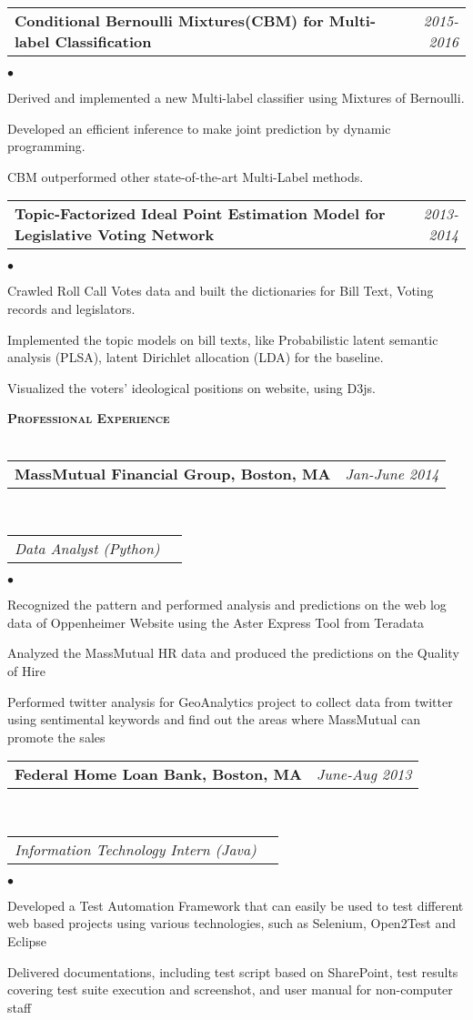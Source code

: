 \documentclass[11pt]{article}
\makeatletter
\newcommand{\lineunder}{\vspace*{-8pt} \\ \hspace*{-18pt} \hrulefill \\}
\newcommand{\header}[1]{{\hspace*{-15pt}\vspace*{6pt} \large \textsc{\textbf{#1}}} \vspace*{-6pt} \lineunder}
\newenvironment{achievements}{\begin{list}{$\bullet$}{\topsep 0pt \itemsep -2pt}}{\vspace*{4pt}\end{list}}
\newcommand{\headerrow}[2]
{\begin{tabular*}{\linewidth}{l@{\extracolsep{\fill}}r}
	\hspace*{-15pt}#1 & #2 \\
\end{tabular*}}
\newcommand{\headerrowww}[1]
{\begin{tabular*}{\linewidth}{l@{\extracolsep{\fill}}r}
	#1 &\\
\end{tabular*}}
\makeatother
\begin{document}
\headerrow
{\textbf{Conditional Bernoulli Mixtures(CBM) for Multi-label Classification}}
{\emph{2015-2016}}
\begin{achievements}
	\item Derived and implemented a new Multi-label classifier using Mixtures of Bernoulli.
	\item Developed an efficient inference to make joint prediction by dynamic programming.
	\item CBM outperformed other state-of-the-art Multi-Label methods.
\end{achievements}

\headerrow
{\textbf{Topic-Factorized Ideal Point Estimation Model for Legislative Voting Network}}
{\emph{2013-2014}}
\begin{achievements}
	\item Crawled Roll Call Votes data and built the dictionaries for Bill Text, Voting records and legislators.
	\item Implemented the topic models on bill texts, like Probabilistic latent semantic analysis (PLSA),  latent Dirichlet allocation (LDA) for the baseline.
	\item Visualized the voters' ideological positions on website, using D3js. 
\end{achievements}



\vspace*{1.5pt}
\header{Professional Experience}

\headerrow
{\textbf{MassMutual Financial Group, Boston, MA}}
{\emph{Jan-June 2014}}
\\
\headerrowww
{\emph{Data Analyst (Python)}}
	\begin{achievements}
	\item Recognized the pattern and performed analysis and predictions on the web log data of Oppenheimer Website using the Aster Express Tool from Teradata
	\item Analyzed the MassMutual HR data and produced the predictions on the Quality of Hire
	\item Performed twitter analysis for GeoAnalytics project to collect data from twitter using sentimental keywords and find out the areas where MassMutual can promote the sales
	\end{achievements}
	

\headerrow
{\textbf{Federal Home Loan Bank, Boston, MA}}
{\emph{June-Aug 2013}}
\\
\headerrowww
{\emph{Information Technology Intern (Java)}}
	\begin{achievements}
	\item Developed a Test Automation Framework that can easily be used to test different web based projects 
	using various technologies, such as Selenium, Open2Test and Eclipse
	\item Delivered  documentations, including test script based on SharePoint, test results covering 
	test suite execution and screenshot, and user manual for non-computer staff 
	\end{achievements}
	
\end{document}

